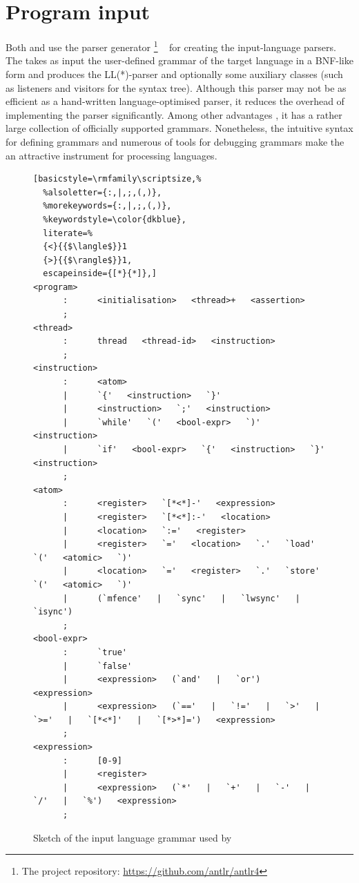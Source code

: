 \section{Program input}
\label{ch:impl:input}

Both \porthos[1] and \porthos[2] use the  parser generator%
%
\footnote{The  project repository: \url{https://github.com/antlr/antlr4}}%
%
~\cite{parr2013definitive} for creating the input-language parsers.
The  takes as input the user-defined grammar of the target language in a BNF-like form and produces the LL(*)-parser and optionally some auxiliary classes (such as listeners and visitors for the syntax tree).
Although this parser may not be as efficient as a hand-written language-optimised parser, it reduces the overhead of implementing the parser significantly.
Among other advantages , it has a rather large collection of officially supported grammars.
Nonetheless, the intuitive syntax for defining grammars and numerous of tools for debugging grammars make the  an attractive instrument for processing languages.

\begin{figure}[t]%
\centering
\begin{minipage}[t]{.6\textwidth}%
\begin{lstlisting}[basicstyle=\rmfamily\scriptsize,%
  %alsoletter={:,|,;,(,)},
  %morekeywords={:,|,;,(,)},
  %keywordstyle=\color{dkblue},
  literate=%
  {<}{{$\langle$}}1
  {>}{{$\rangle$}}1,
  escapeinside={[*}{*]},]
<program>
      :      <initialisation>   <thread>+   <assertion>
      ;
<thread>
      :      thread   <thread-id>   <instruction>
      ;
<instruction>
      :      <atom>
      |      `{'   <instruction>   `}'
      |      <instruction>   `;'   <instruction>
      |      `while'   `('   <bool-expr>   `)'   <instruction>
      |      `if'   <bool-expr>   `{'   <instruction>   `}'   <instruction>
      ;
<atom>   
      :      <register>   `[*<*]-'   <expression>
      |      <register>   `[*<*]:-'   <location>
      |      <location>   `:='   <register>
      |      <register>   `='   <location>   `.'   `load'    `('   <atomic>   `)'
      |      <location>   `='   <register>   `.'   `store'   `('   <atomic>   `)'
      |      (`mfence'   |   `sync'   |   `lwsync'   |   `isync')
      ;
<bool-expr>
      :      `true'
      |      `false'
      |      <expression>   (`and'   |   `or')   <expression>
      |      <expression>   (`=='   |   `!='   |   `>'   |   `>='   |   `[*<*]'   |   `[*>*]=')   <expression>
      ;
<expression>
      :      [0-9]
      |      <register>
      |      <expression>   (`*'   |   `+'   |   `-'   |   `/'   |   `%')   <expression>
      ;
\end{lstlisting}
\end{minipage}
\caption{Sketch of the input language grammar used by \oldporthos{}}
\label{fig:in_grammar_pts}
\end{figure}

